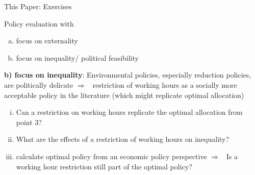 \documentclass[11pt,aspectratio=169]{beamer}
\newcommand{\ar}{$\Rightarrow$ \ }
\begin{document}
\begin{frame}{This Paper: Exercises}
	\begin{block}{Policy evaluation with}
		\begin{enumerate}[a)]
			\item focus on externality
			\item focus on inequality/ political feasibility
		\end{enumerate}
	\end{block} 
\pause
		\textbf{b) focus on inequality}: Environmental policies, especially reduction policies, are politically delicate \ar restriction of working hours as a socially more acceptable policy in the literature (which might replicate optimal allocation)
	\pause
	\begin{enumerate}[(i)]
		\item<+-> Can a restriction on working hours replicate the optimal allocation from point 3?
		\vspace{2mm}
		\item<+-> What are the effects of a restriction of working hours on inequality? 
		\vspace{2mm}
		\item<+-> calculate optimal policy from an economic policy perspective \ar Is a working hour restriction still part of the optimal policy? 
	\end{enumerate}
\end{frame}
\end{document}
